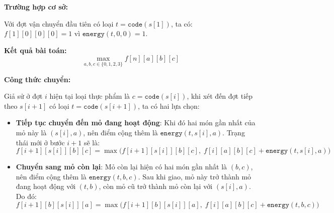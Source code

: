 \textbf{Trường hợp cơ sở:}

Với đợt vận chuyển đầu tiên có loại $t = \texttt{code}(s[1])$, ta có: $f[1][0][0][0] = 1$
vì $\texttt{energy}(t,0,0) = 1$.


\textbf{Kết quả bài toán:} 
\[
\max_{a,b,c \in \{0,1,2,3\}} f[n][a][b][c]
\]


\textbf{Công thức chuyển:}

Giả sử ở đợt $i$ hiện tại loại thực phẩm là $c = \texttt{code}(s[i])$, khi xét đến đợt tiếp theo $s[i+1]$ có loại $t = \texttt{code}(s[i+1])$, ta có hai lựa chọn:

\begin{itemize}
    \item \textbf{Tiếp tục chuyển đến mỏ đang hoạt động}:  
    Khi đó hai món gần nhất của mỏ này là $(s[i], a)$, nên điểm cộng thêm là $\texttt{energy}(t, s[i], a)$.  
    Trạng thái mới ở bước $i+1$ sẽ là:
    \[
    f[i+1][s[i]][b][c] = \max\Big(f[i+1][s[i]][b][c],\; f[i][a][b][c] + \texttt{energy}(t, s[i], a)\Big)
    \]

    \item \textbf{Chuyển sang mỏ còn lại}:  
    Mỏ còn lại hiện có hai món gần nhất là $(b, c)$, nên điểm cộng thêm là $\texttt{energy}(t, b, c)$.  
    Sau khi giao, mỏ này trở thành mỏ đang hoạt động với $(t, b)$, còn mỏ cũ trở thành mỏ còn lại với $(s[i], a)$.  
    Do đó:
    \[
    f[i+1][b][s[i]][a] = \max\Big(f[i+1][b][s[i]][a],\; f[i][a][b][c] + \texttt{energy}(t, b, c)\Big)
    \]
\end{itemize}



